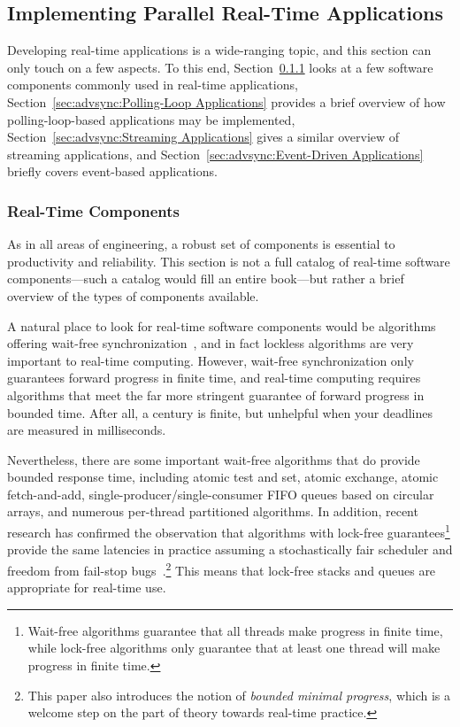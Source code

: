 \subsection{Implementing Parallel Real-Time Applications}
\label{sec:advsync:Implementing Parallel Real-Time Applications}

Developing real-time applications is a wide-ranging topic, and this
section can only touch on a few aspects.
To this end,
Section~\ref{sec:advsync:Real-Time Components}
looks at a few software components commonly used in real-time applications,
Section~\ref{sec:advsync:Polling-Loop Applications}
provides a brief overview of how polling-loop-based applications may
be implemented,
Section~\ref{sec:advsync:Streaming Applications}
gives a similar overview of streaming applications, and
Section~\ref{sec:advsync:Event-Driven Applications}
briefly covers event-based applications.

\subsubsection{Real-Time Components}
\label{sec:advsync:Real-Time Components}

As in all areas of engineering, a robust set of components is essential
to productivity and reliability.
This section is not a full catalog of real-time software components---such
a catalog would fill an entire book---but rather a brief overview of the
types of components available.

A natural place to look for real-time software components would be
algorithms offering wait-free
synchronization~\cite{Herlihy91}, and in fact lockless
algorithms are very important to real-time computing.
However, wait-free synchronization only guarantees forward progress in
finite time, and real-time computing requires algorithms that meet the
far more stringent guarantee of forward progress in bounded time.
After all, a century is finite, but unhelpful when your deadlines are
measured in milliseconds.

Nevertheless, there are some important wait-free algorithms that do
provide bounded response time, including atomic test and set,
atomic exchange,
atomic fetch-and-add,
single-producer/single-consumer FIFO queues based on circular arrays,
and numerous per-thread partitioned algorithms.
In addition, recent research has confirmed the observation that
algorithms with lock-free guarantees\footnote{
	Wait-free algorithms guarantee that all threads make progress in
	finite time, while lock-free algorithms only guarantee that at
	least one thread will make progress in finite time.}
provide the same latencies in practice assuming a stochastically
fair scheduler and freedom from fail-stop
bugs~\cite{DanAlitarh2013PracticalProgress}.\footnote{
	This paper also introduces the notion of \emph{bounded minimal
	progress}, which is a welcome step on the part of theory
	towards real-time practice.}
This means that lock-free stacks and queues are appropriate
for real-time use.


